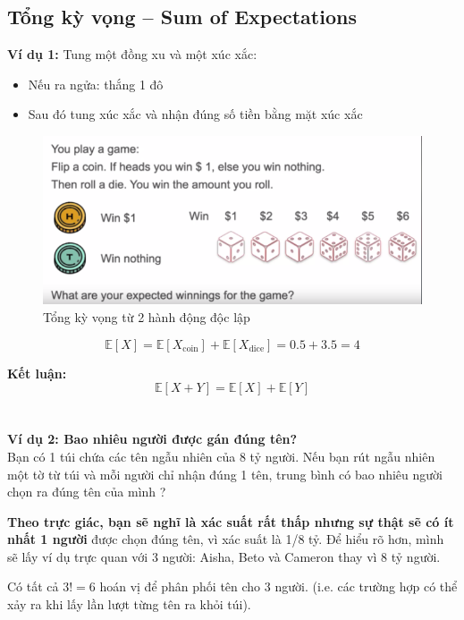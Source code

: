 \documentclass[11pt]{article}
\begin{document}
\subsection{Tổng kỳ vọng – Sum of Expectations}

\textbf{Ví dụ 1:} Tung một đồng xu và một xúc xắc:
\begin{itemize}
    \item Nếu ra ngửa: thắng 1 đô
    \item Sau đó tung xúc xắc và nhận đúng số tiền bằng mặt xúc xắc
\end{itemize}

\begin{figure}[H]
    \centering
    \includegraphics[width=0.8\linewidth]{images/coin_dice_expectation.png}
    \caption{Tổng kỳ vọng từ 2 hành động độc lập}
\end{figure}

\[
\mathbb{E}[X] = \mathbb{E}[X_{\text{coin}}] + \mathbb{E}[X_{\text{dice}}] = 0.5 + 3.5 = 4
\]

\textbf{Kết luận:} 
\[
\mathbb{E}[X + Y] = \mathbb{E}[X] + \mathbb{E}[Y] 
\] \\ \\


 
\textbf{Ví dụ 2: Bao nhiêu người được gán đúng tên?} \\ 
Bạn có 1 túi chứa các tên ngẫu nhiên của 8 tỷ người. Nếu bạn rút ngẫu nhiên một tờ từ túi và mỗi người chỉ nhận đúng 1 tên, trung bình có bao nhiêu người chọn ra đúng tên của mình ?

\vspace{0.5em}

\textbf{Theo trực giác, bạn sẽ nghĩ là xác suất rất thấp nhưng sự thật sẽ có ít nhất 1 người} được chọn đúng tên, vì xác suất là 1/8 tỷ. Để hiểu rõ hơn, mình sẽ lấy ví dụ trực quan với 3 người: Aisha, Beto và Cameron thay vì 8 tỷ người.

\vspace{1em}

Có tất cả $3! = 6$ hoán vị để phân phối tên cho 3 người. (i.e. các trường hợp có thể xảy ra khi lấy lần lượt từng tên ra khỏi túi).
\end{document}
